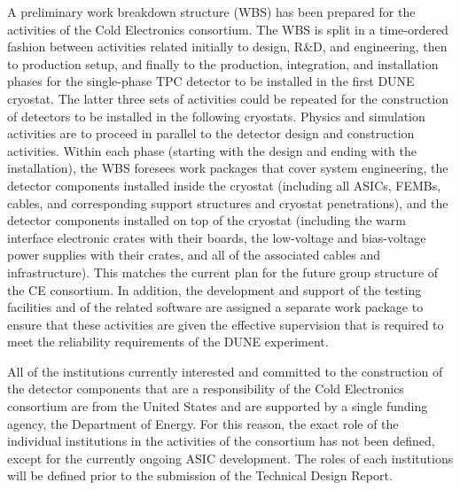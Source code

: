 A preliminary work breakdown structure (WBS) has been prepared for the activities
of the Cold Electronics consortium. The WBS is split in a time-ordered fashion
between activities related initially to design, R\&D, and engineering, then
to production setup, and finally to the production, integration, and installation
phases for the single-phase TPC detector to be installed in the first DUNE cryostat.
The latter three sets of activities could be repeated for the construction
of detectors to be installed in the following cryostats. Physics and simulation
activities are to proceed in parallel to the detector design and construction activities.
Within each phase (starting with the design and ending with the installation),
the WBS foresees work packages that cover system engineering, the detector
components installed inside the cryostat (including all ASICs, FEMBs,
cables, and corresponding support structures and cryostat penetrations),
and the detector components installed on top of the cryostat (including the warm
interface electronic crates with their boards, the low-voltage and bias-voltage
power supplies with their crates, and all of the associated cables and infrastructure). This
matches the current plan for the future group structure of the CE consortium. In
addition, the development and support of the testing facilities and of
the related software are assigned a separate work package to ensure that these activities
are given the effective supervision that is required to meet the reliability
requirements of the DUNE experiment.

All of the institutions currently interested and committed to the construction of
the detector components that are a responsibility of the Cold Electronics
consortium are from the United States and are supported by a single
funding agency, the Department of Energy. For this reason, the exact role of
the individual institutions in the activities of the consortium has not been
defined, except for the currently ongoing ASIC development. The roles of
each institutions will be defined prior to the submission of the Technical
Design Report.
